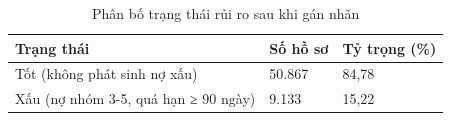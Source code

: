 \begin{table}[!htbp]
\centering
\caption{Phân bố trạng thái rủi ro sau khi gán nhãn}
\label{tab:label}
\small
\setlength{\tabcolsep}{5.0pt}
\begin{tabular}{@{}L{8.0cm}R{2.6cm}R{2.6cm}@{}}
\toprule
\textbf{Trạng thái} & \textbf{Số hồ sơ} & \textbf{Tỷ trọng (\%)} \\
\midrule
Tốt (không phát sinh nợ xấu) & 50.867 & 84,78 \\
Xấu (nợ nhóm 3-5, quá hạn ≥ 90 ngày) & 9.133 & 15,22 \\
\bottomrule
\end{tabular}
\end{table}
